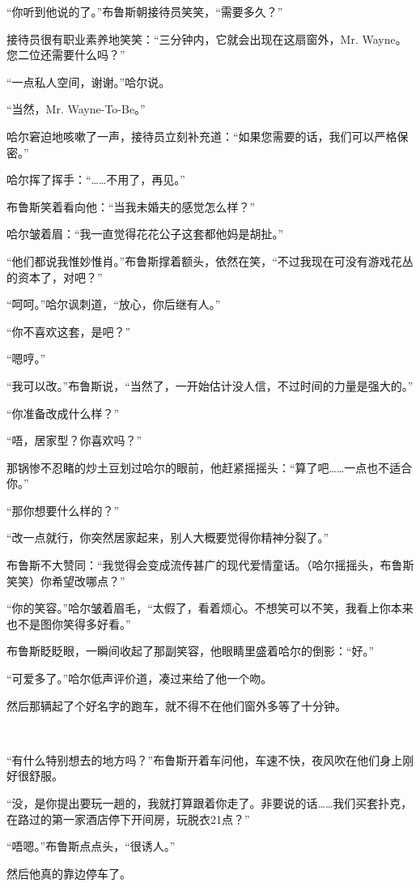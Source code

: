 \documentclass[../main]{subfiles}
\begin{document}
“你听到他说的了。”布鲁斯朝接待员笑笑，“需要多久？”

接待员很有职业素养地笑笑：“三分钟内，它就会出现在这扇窗外，Mr.
Wayne。您二位还需要什么吗？”

“一点私人空间，谢谢。”哈尔说。

“当然，Mr. Wayne-To-Be。”

哈尔窘迫地咳嗽了一声，接待员立刻补充道：“如果您需要的话，我们可以严格保密。”

哈尔挥了挥手：“……不用了，再见。”

布鲁斯笑着看向他：“当我未婚夫的感觉怎么样？”

哈尔皱着眉：“我一直觉得花花公子这套都他妈是胡扯。”

“他们都说我惟妙惟肖。”布鲁斯撑着额头，依然在笑，“不过我现在可没有游戏花丛的资本了，对吧？”

“呵呵。”哈尔讽刺道，“放心，你后继有人。”

“你不喜欢这套，是吧？”

“嗯哼。”

“我可以改。”布鲁斯说，“当然了，一开始估计没人信，不过时间的力量是强大的。”

“你准备改成什么样？”

“唔，居家型？你喜欢吗？”

那锅惨不忍睹的炒土豆划过哈尔的眼前，他赶紧摇摇头：“算了吧……一点也不适合你。”

“那你想要什么样的？”

“改一点就行，你突然居家起来，别人大概要觉得你精神分裂了。”

布鲁斯不大赞同：“我觉得会变成流传甚广的现代爱情童话。（哈尔摇摇头，布鲁斯笑笑）你希望改哪点？”

“你的笑容。”哈尔皱着眉毛，“太假了，看着烦心。不想笑可以不笑，我看上你本来也不是图你笑得多好看。”

布鲁斯眨眨眼，一瞬间收起了那副笑容，他眼睛里盛着哈尔的倒影：“好。”

“可爱多了。”哈尔低声评价道，凑过来给了他一个吻。

然后那辆起了个好名字的跑车，就不得不在他们窗外多等了十分钟。

~\

“有什么特别想去的地方吗？”布鲁斯开着车问他，车速不快，夜风吹在他们身上刚好很舒服。

“没，是你提出要玩一趟的，我就打算跟着你走了。非要说的话……我们买套扑克，在路过的第一家酒店停下开间房，玩脱衣21点？”

“唔嗯。”布鲁斯点点头，“很诱人。”

然后他真的靠边停车了。
\end{document}
